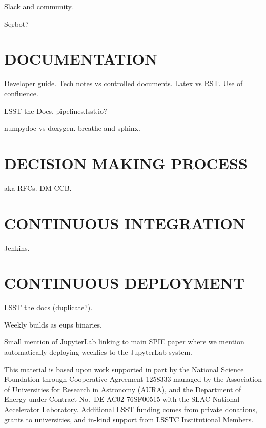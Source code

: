 \documentclass[]{spie}  %
\begin{document}
Slack and community.

Sqrbot?

\section{DOCUMENTATION}

Developer guide.
Tech notes vs controlled documents.
Latex vs RST.
Use of confluence.

LSST the Docs.
pipelines.lsst.io?

numpydoc vs doxygen. breathe and sphinx.

\section{DECISION MAKING PROCESS}

aka RFCs.
DM-CCB.

\section{CONTINUOUS INTEGRATION}

Jenkins.

\section{CONTINUOUS DEPLOYMENT}

LSST the docs (duplicate?).

Weekly builds as eups binaries.

Small mention of JupyterLab linking to main SPIE paper where we mention automatically deploying weeklies to the JupyterLab system.


\acknowledgments %

This material is based upon work supported in part by the National Science Foundation through Cooperative Agreement 1258333 managed by the Association of Universities for Research in Astronomy (AURA), and the Department of Energy under Contract No.\ DE-AC02-76SF00515 with the SLAC National Accelerator Laboratory.
Additional LSST funding comes from private donations, grants to universities, and in-kind support from LSSTC Institutional Members.

\end{document}

